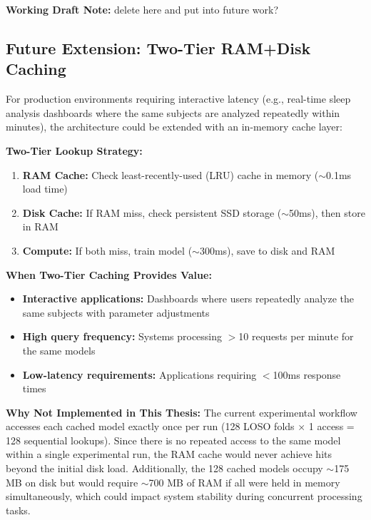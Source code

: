 \documentclass{imc-inf} %
\begin{document}
\begin{center}
\colorbox{yellow!20}{%
\begin{minipage}{0.9\textwidth}
\textbf{Working Draft Note:} 
delete here and put into future work?
\end{minipage}
}
\end{center}

\subsection{Future Extension: Two-Tier RAM+Disk Caching}

For production environments requiring interactive latency (e.g., real-time sleep 
analysis dashboards where the same subjects are analyzed repeatedly within minutes), 
the architecture could be extended with an in-memory cache layer:

\textbf{Two-Tier Lookup Strategy:}
\begin{enumerate}
\item \textbf{RAM Cache:} Check least-recently-used (LRU) cache in memory 
      ($\sim$0.1ms load time)
\item \textbf{Disk Cache:} If RAM miss, check persistent SSD storage ($\sim$50ms), 
      then store in RAM
\item \textbf{Compute:} If both miss, train model ($\sim$300ms), save to disk 
      and RAM
\end{enumerate}

\textbf{When Two-Tier Caching Provides Value:}
\begin{itemize}
\item \textbf{Interactive applications:} Dashboards where users repeatedly analyze 
      the same subjects with parameter adjustments
\item \textbf{High query frequency:} Systems processing $>$10 requests per minute 
      for the same models
\item \textbf{Low-latency requirements:} Applications requiring $<$100ms response times
\end{itemize}

\textbf{Why Not Implemented in This Thesis:}
The current experimental workflow accesses each cached model exactly once per run 
(128 LOSO folds $\times$ 1 access = 128 sequential lookups). Since there is no 
repeated access to the same model within a single experimental run, the RAM cache 
would never achieve hits beyond the initial disk load. Additionally, the 128 
cached models occupy $\sim$175 MB on disk but would require $\sim$700 MB of RAM 
if all were held in memory simultaneously, which could impact system stability 
during concurrent processing tasks.
\end{document}

